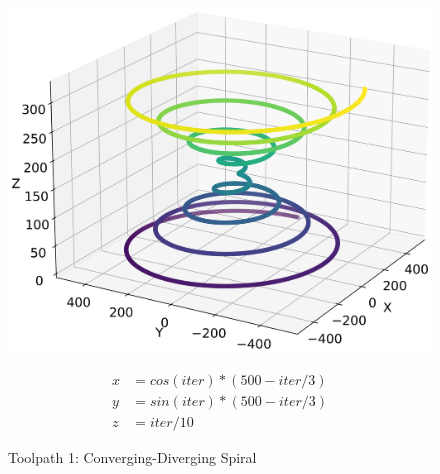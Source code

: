 \begin{figure}[H]%
	\centering
	\begin{minipage}{0.5\textwidth}
		\includegraphics[width=\textwidth]{figures/path1.png}
		\caption{Toolpath 1: Converging-Diverging Spiral}
		\label{path1}
	\end{minipage}\hfill
	\begin{minipage}{0.5\textwidth}
		\begin{equation}\label{eq1}
			\begin{split}
				x &= cos(iter) * (500 - iter / 3)\\
				y &= sin(iter) * (500 - iter / 3)\\
				z &= iter / 10
			\end{split}
		\end{equation}
	\end{minipage}\par
\end{figure}

